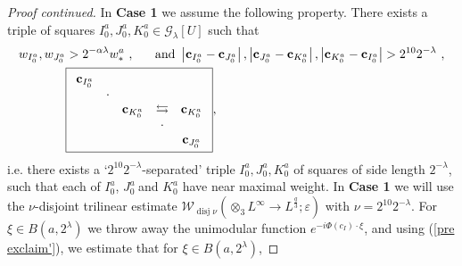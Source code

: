 \documentclass{amsart}%
\theoremstyle{plain}
\numberwithin{equation}{section}
\begin{document}
\begin{proof}
[Proof continued]In \textbf{Case 1} we assume the following property. There
exists a triple of squares $I_{0}^{a},J_{0}^{a},K_{0}^{a}\in\mathcal{G}%
_{\lambda}\left[  U\right]  $ such that%
\begin{align*}
w_{I_{0}^{a}},w_{J_{0}^{a}}  &  >2^{-\alpha\lambda}w_{\ast}^{a}%
\ ,\ \ \ \ \ \text{and }\left\vert \mathbf{c}_{I_{0}^{a}}-\mathbf{c}%
_{J_{0}^{a}}\right\vert ,\left\vert \mathbf{c}_{J_{0}^{a}}-\mathbf{c}%
_{K_{0}^{a}}\right\vert ,\left\vert \mathbf{c}_{K_{0}^{a}}-\mathbf{c}%
_{I_{0}^{a}}\right\vert >2^{10}2^{-\lambda}\ ,\\
&  \fbox{$%
\begin{array}
[c]{ccccc}%
\mathbf{c}_{I_{0}^{a}} &  &  &  & \\
& \cdot &  &  & \\
&  & \mathbf{c}_{K_{0}^{a}} & \leftrightarrows & \mathbf{c}_{K_{0}^{a}}\\
&  &  & \cdot & \\
&  &  &  & \mathbf{c}_{J_{0}^{a}}%
\end{array}
$},
\end{align*}
i.e. there exists a `$2^{10}2^{-\lambda}$-separated' triple $I_{0}^{a}%
,J_{0}^{a},K_{0}^{a}$ of squares of side length $2^{-\lambda}$, such that each
of $I_{0}^{a}$, $J_{0}^{a}\ $and $K_{0}^{a}$ have near maximal weight. In
\textbf{Case 1} we will use the $\nu$-disjoint trilinear estimate
$\mathcal{W}_{\operatorname*{disj}\nu}\left(  \otimes_{3}L^{\infty}\rightarrow
L^{\frac{q}{3}};\varepsilon\right)  $ with $\nu=2^{10}2^{-\lambda}$. For
$\xi\in B\left(  a,2^{\lambda}\right)  $ we throw away the unimodular function
$e^{-i\Phi\left(  c_{I}\right)  \cdot\xi}$, and using (\ref{pre exclaim'}), we
estimate that for $\xi\in B\left(  a,2^{\lambda}\right)  $,%


\end{proof}
\end{document}
